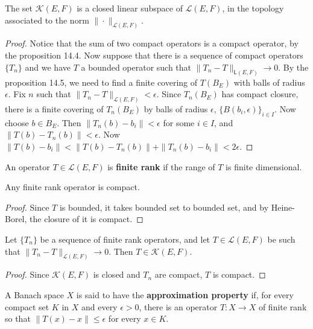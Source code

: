 \begin{thm} The set $\mathcal{K}(E,F)$ is a closed linear subspace of $\mathcal{L}(E,F)$, in the topology associated to the norm $\|\cdot \|_{\mathcal{L}(E,F)}$.
\end{thm}
\begin{proof} Notice that the sum of two compact operators is a compact operator, by the proposition 14.4. Now suppose that there is a sequence of compact operators $\{T_n\}$ and we have $T$ a bounded operator such that $\|T_n-T\|_{\mathsf{L}(E,F)}\rightarrow 0$. By the proposition 14.5, we need to find a finite covering of $T(B_E)$ with balls of radius $\epsilon$. Fix $n$ such that $\|T_n-T\|_{\mathcal{L}(E,F)}<\epsilon$. Since $T_n(B_E)$ has compact closure, there is a finite covering of $T_n(B_E)$ by balls of radius $\epsilon$, $\{B(b_i,\epsilon)\}_{i\in I}$. Now choose $b\in B_E$. Then $\|T_n(b)-b_i\|<\epsilon$ for some $i\in I$, and $\|T(b)-T_n(b)\|<\epsilon$. Now $\|T(b)-b_i\|<\|T(b)-T_n(b)\|+\|T_n(b)-b_i\|<2\epsilon$.
\end{proof}

\begin{defn}
An operator $T\in \mathcal{L}(E,F)$ is \textbf{finite rank} if the range of $T$ is finite dimensional.
\end{defn}

\begin{prop} Any finite rank operator is compact.
\end{prop}
\begin{proof}
Since $T$ is bounded, it takes bounded set to bounded set, and by Heine-Borel, the closure of it is compact.
\end{proof}

\begin{cor} Let $\{T_n\}$ be a sequence of finite rank operators, and let $T\in \mathcal{L}(E,F)$ be such that $\|T_n-T\|_{\mathcal{L}(E,F)}\rightarrow 0$. Then $T\in \mathcal{K}(E,F)$.
\end{cor}
\begin{proof}
Since $\mathcal{K}(E,F)$ is closed and $T_n$ are compact, $T$ is compact.
\end{proof}

\begin{defn} A Banach space $X$ is said to have the \textbf{approximation property} if, for every compact set $K$ in $X$ and every $\epsilon>0$, there is an operator $T:X\rightarrow X$ of finite rank so that $\|T(x)-x\|\leq \epsilon$ for every $x\in K$.
\end{defn}

